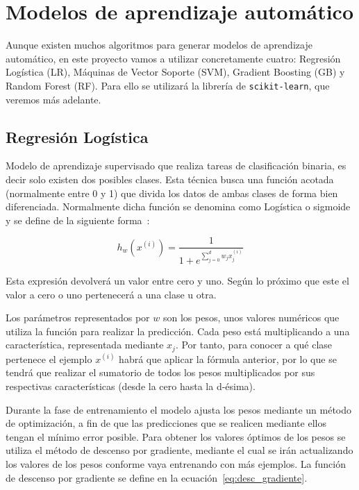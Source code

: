 \documentclass[a4paper, 12pt]{book}
\begin{document}
\section{Modelos de aprendizaje automático}
\label{sec:modelos_aautomatico}

Aunque existen muchos algoritmos para generar modelos de aprendizaje automático, en este proyecto vamos a utilizar concretamente cuatro: Regresión Logística (LR), Máquinas de Vector Soporte (SVM), Gradient Boosting (GB) y Random Forest (RF). Para ello se utilizará la librería de \texttt{scikit-learn}, que veremos más adelante.

\subsection{Regresión Logística}
\label{subsec:regresion_logistica}

Modelo de aprendizaje supervisado que realiza tareas de clasificación binaria, es decir solo existen dos posibles clases. Esta técnica busca una función acotada (normalmente entre 0 y 1) que divida los datos de ambas clases de forma bien diferenciada. Normalmente dicha función se denomina como Logística o sigmoide y se define de la siguiente forma~\cite{Watt2020}:

\begin{equation}
    h_w(x^{(i)}) = \frac{1}{1 + e^{\sum_{j=0}^{d} w_j x_j^{(i)} }}
\end{equation}

Esta expresión devolverá un valor entre cero y uno. Según lo próximo que este el valor a cero o uno pertenecerá a una clase u otra. 

Los parámetros representados por $w$ son los pesos, unos valores numéricos que utiliza la función para realizar la predicción. Cada peso está multiplicando a una característica, representada mediante $x_j$. Por tanto, para conocer a qué clase pertenece el ejemplo $x^{(i)}$ habrá que aplicar la fórmula anterior, por lo que se tendrá que realizar el sumatorio de todos los pesos multiplicados por sus respectivas características (desde la cero hasta la d-ésima). 

Durante la fase de entrenamiento el modelo ajusta los pesos mediante un método de optimización, a fin de que las predicciones que se realicen mediante ellos tengan el mínimo error posible. Para obtener los valores óptimos de los pesos se utiliza el método de descenso por gradiente, mediante el cual se irán actualizando los valores de los pesos conforme vaya entrenando con más ejemplos. La función de descenso por gradiente se define en la ecuación~\ref{eq:desc_gradiente}.
\end{document}
